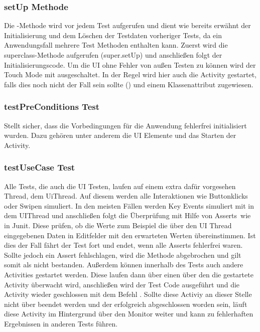 \subsubsection*{setUp Methode}
Die -Methode wird vor jedem Test aufgerufen und dient wie bereits erwähnt der Initialisierung und dem Löschen der Testdaten vorheriger Tests, da ein Anwendungsfall mehrere Test Methoden enthalten kann. Zuerst wird die superclass-Methode aufgerufen (super.setUp) und anschließen folgt der Initialisierungscode. Um die UI ohne Fehler von außen Testen zu können wird der Touch Mode mit  ausgeschaltet. In der Regel wird hier auch die Activity gestartet, falls dies noch nicht der Fall sein sollte () und einem Klassenattribut  zugewiesen.

\subsubsection*{testPreConditions Test}
Stellt sicher, dass die Vorbedingungen für die Anwendung fehlerfrei initialisiert wurden. Dazu gehören unter anderem die UI Elemente und das Starten der Activity.

\subsubsection*{testUseCase Test}
Alle Tests, die auch die UI Testen, laufen auf einem extra dafür vorgesehen Thread, dem UiThread. Auf diesem werden alle Interaktionen wie Buttonklicks oder Swipen simuliert. In den meisten Fällen werden Key Events simuliert mit  in dem UIThread und anschließen folgt die Überprüfung mit Hilfe von \glqq Asserts\grqq\ wie in Junit. Diese prüfen, ob die Werte zum Beispiel die über den UI Thread eingegebenen Daten in Editfelder mit den erwarteten Werten übereinstimmen. Ist dies der Fall fährt der Test fort und endet, wenn alle Asserts fehlerfrei waren. Sollte jedoch ein Assert fehlschlagen, wird die Methode  abgebrochen und gilt somit als nicht bestanden. Außerdem können innerhalb des Tests auch andere Activities gestartet werden. Diese laufen dann über einen  über den die gestartete Activity überwacht wird, anschließen wird der Test Code ausgeführt und die Activity wieder geschlossen mit dem Befehl . Sollte diese Activiy an dieser Stelle nicht über  beendet werden und der  erfolgreich abgeschlossen worden sein, läuft diese Activity im Hintergrund über den Monitor weiter und kann zu fehlerhaften Ergebnissen in anderen Tests führen.

